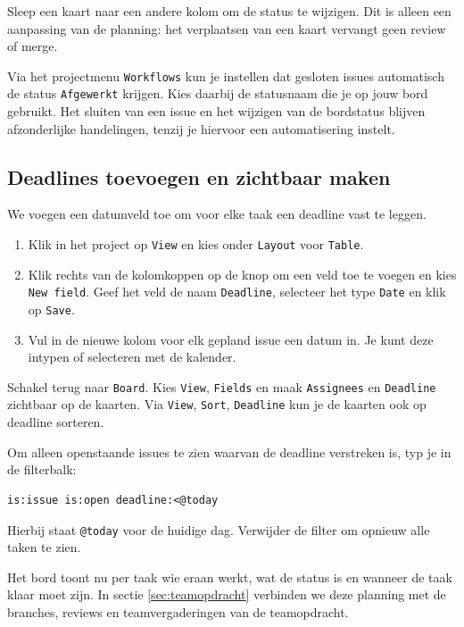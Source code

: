 \documentclass[kulak]{kulakarticle} %
\begin{document}
Sleep een kaart naar een andere kolom om de status te wijzigen. Dit is
alleen een aanpassing van de planning: het verplaatsen van een kaart
vervangt geen review of merge.

Via het projectmenu \texttt{Workflows} kun je instellen dat gesloten issues
automatisch de status \texttt{Afgewerkt} krijgen. Kies daarbij de statusnaam
die je op jouw bord gebruikt. Het sluiten van een issue en het wijzigen
van de bordstatus blijven afzonderlijke handelingen, tenzij je hiervoor
een automatisering instelt.

\subsection{Deadlines toevoegen en zichtbaar maken}
\label{ssec:projectdeadlines}

We voegen een datumveld toe om voor elke taak een deadline vast te leggen.
\begin{enumerate}
    \item Klik in het project op \texttt{View} en kies onder
    \texttt{Layout} voor \texttt{Table}.
    \item Klik rechts van de kolomkoppen op de knop om een veld toe te
    voegen en kies \texttt{New field}. Geef het veld de naam
    \texttt{Deadline}, selecteer het type \texttt{Date} en klik op
    \texttt{Save}.
    \item Vul in de nieuwe kolom voor elk gepland issue een datum in.
    Je kunt deze intypen of selecteren met de kalender.
\end{enumerate}

Schakel terug naar \texttt{Board}. Kies \texttt{View}, \texttt{Fields} en
maak \texttt{Assignees} en \texttt{Deadline} zichtbaar op de kaarten.
Via \texttt{View}, \texttt{Sort}, \texttt{Deadline} kun je de kaarten ook
op deadline sorteren.

Om alleen openstaande issues te zien waarvan de deadline verstreken is,
typ je in de filterbalk:
\begin{verbatim}
is:issue is:open deadline:<@today
\end{verbatim}
Hierbij staat \texttt{@today} voor de huidige dag. Verwijder de filter om
opnieuw alle taken te zien.

Het bord toont nu per taak wie eraan werkt, wat de status is en wanneer de
taak klaar moet zijn. In sectie \ref{sec:teamopdracht} verbinden we deze
planning met de branches, reviews en teamvergaderingen van de teamopdracht.
\end{document}
